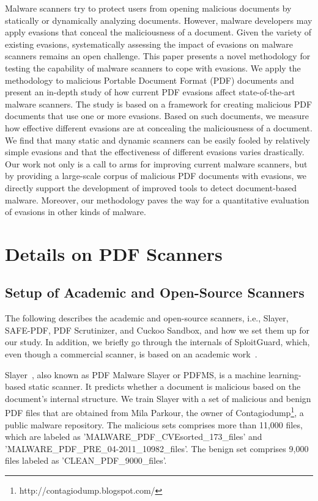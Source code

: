 Malware scanners try to protect users from opening malicious documents by statically or dynamically analyzing documents.
However, malware developers may apply evasions that conceal the maliciousness of a document.
Given the variety of existing evasions, systematically assessing the impact of evasions on malware scanners remains an open challenge.
This paper presents a novel methodology for testing the capability of malware scanners to cope with evasions.
We apply the methodology to malicious Portable Document Format (PDF) documents and present an in-depth study of how current PDF evasions affect \nbAnalyzers{} state-of-the-art malware scanners.
The study is based on a framework for creating malicious PDF documents that use one or more evasions.
Based on such documents, we measure how effective different evasions are at concealing the maliciousness of a document.
We find that many static and dynamic scanners can be easily fooled by relatively simple evasions and that the effectiveness of different evasions varies drastically.
Our work not only is a call to arms for improving current malware scanners, but by providing a large-scale corpus of malicious PDF documents with evasions, we directly support the development of improved tools to detect document-based malware.
Moreover, our methodology paves the way for a quantitative evaluation of evasions in other kinds of malware.

\section{Details on PDF Scanners}

\subsection{Setup of Academic and Open-Source Scanners}
\label{sec:scanner setup}

The following describes the academic and open-source scanners, i.e.,
Slayer, SAFE-PDF, PDF Scrutinizer, and Cuckoo Sandbox,
and how we set them up for our study.
In addition, we briefly go through the internals of SploitGuard, which, even though a commercial scanner, is based on an  academic work~\cite{payer2015fine}.

Slayer~\cite{maiorca2012pattern}, also known as PDF Malware Slayer or PDFMS, is a machine learning-based static scanner. It predicts whether a document is malicious based on the document's internal structure.
We train Slayer with a set of malicious and benign PDF files that are obtained from Mila Parkour, the owner of Contagiodump\footnote{http://contagiodump.blogspot.com/}, a public malware repository.
The malicious sets comprises more than 11,000 files, which are labeled as 'MALWARE\_PDF\_CVEsorted\_173\_files' and 'MALWARE\_PDF\_PRE\_04-2011\_10982\_files'.
The benign set comprises 9,000 files labeled as 'CLEAN\_PDF\_9000\_files'.

